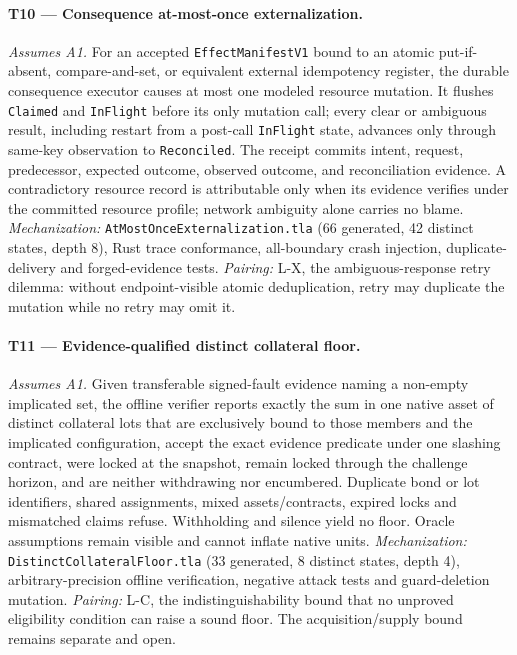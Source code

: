 \documentclass[11pt]{article}
\newcommand{\code}[1]{\texttt{#1}}
\begin{document}
\paragraph{T10 --- Consequence at-most-once externalization.}
\textit{Assumes A1.} For an accepted \code{EffectManifestV1} bound to an
atomic put-if-absent, compare-and-set, or equivalent external idempotency
register, the durable consequence executor causes at most one modeled
resource mutation. It flushes \code{Claimed} and \code{InFlight} before its
only mutation call; every clear or ambiguous result, including restart from a
post-call \code{InFlight} state, advances only through same-key observation to
\code{Reconciled}. The receipt commits intent, request, predecessor, expected
outcome, observed outcome, and reconciliation evidence. A contradictory
resource record is attributable only when its evidence verifies under the
committed resource profile; network ambiguity alone carries no blame.
\textit{Mechanization:} \code{AtMostOnceExternalization.tla} (66 generated,
42 distinct states, depth 8), Rust trace conformance, all-boundary crash
injection, duplicate-delivery and forged-evidence tests. \textit{Pairing:}
L-X, the ambiguous-response retry dilemma: without endpoint-visible atomic
deduplication, retry may duplicate the mutation while no retry may omit it.

\paragraph{T11 --- Evidence-qualified distinct collateral floor.}
\textit{Assumes A1.} Given transferable signed-fault evidence naming a
non-empty implicated set, the offline verifier reports exactly the sum in one
native asset of distinct collateral lots that are exclusively bound to those
members and the implicated configuration, accept the exact evidence predicate
under one slashing contract, were locked at the snapshot, remain locked
through the challenge horizon, and are neither withdrawing nor encumbered.
Duplicate bond or lot identifiers, shared assignments, mixed assets/contracts,
expired locks and mismatched claims refuse. Withholding and silence yield no
floor. Oracle assumptions remain visible and cannot inflate native units.
\textit{Mechanization:} \code{DistinctCollateralFloor.tla} (33 generated,
8 distinct states, depth 4), arbitrary-precision offline verification,
negative attack tests and guard-deletion mutation. \textit{Pairing:} L-C,
the indistinguishability bound that no unproved eligibility condition can
raise a sound floor. The acquisition/supply bound remains separate and open.
\end{document}
